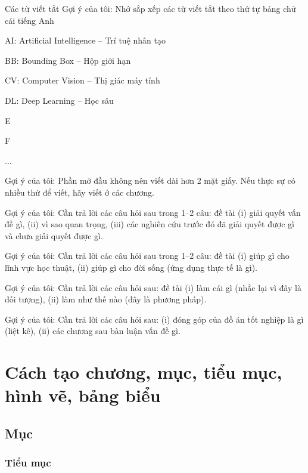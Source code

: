 \documentclass[thesis]{femathesis}
\begin{document}
\begin{contentlisting}
\tableofcontents
\listoffigures
\listoftables

\begin{contentlistingsection}{Các từ viết tắt}
Gợi ý của tôi: Nhớ sắp xếp các từ viết tắt theo thứ tự bảng chữ cái tiếng Anh

AI: Artificial Intelligence -- Trí tuệ nhân tạo

BB: Bounding Box -- Hộp giới hạn

CV: Computer Vision -- Thị giác máy tính

DL: Deep Learning -- Học sâu

E

F

...
\end{contentlistingsection}
\end{contentlisting}


Gợi ý của tôi: Phần mở đầu không nên viết dài hơn 2 mặt giấy. Nếu thực sự có nhiều thứ để viết, hãy viết ở các chương.

Gợi ý của tôi: Cần trả lời các câu hỏi sau trong 1--2 câu: đề tài (i) giải quyết vấn đề gì, (ii) vì sao quan trọng, (iii) các nghiên cứu trước đó đã giải quyết được gì và chưa giải quyết được gì. 

Gợi ý của tôi: Cần trả lời các câu hỏi sau trong 1--2 câu: đề tài (i) giúp gì cho lĩnh vực học thuật, (ii) giúp gì cho đời sống (ứng dụng thực tế là gì).

Gợi ý của tôi: Cần trả lời các câu hỏi sau: đề tài (i) làm cái gì (nhắc lại vì đây là đối tượng), (ii) làm như thế nào (đây là phương pháp).


Gợi ý của tôi: Cần trả lời các câu hỏi sau: (i) đóng góp của đồ án tốt nghiệp là gì (liệt kê), (ii) các chương sau bàn luận vấn đề gì.


\chapter{Cách tạo chương, mục, tiểu mục, hình vẽ, bảng biểu}
\section{Mục}
\subsection{Tiểu mục}
\blindtext
\end{document}
